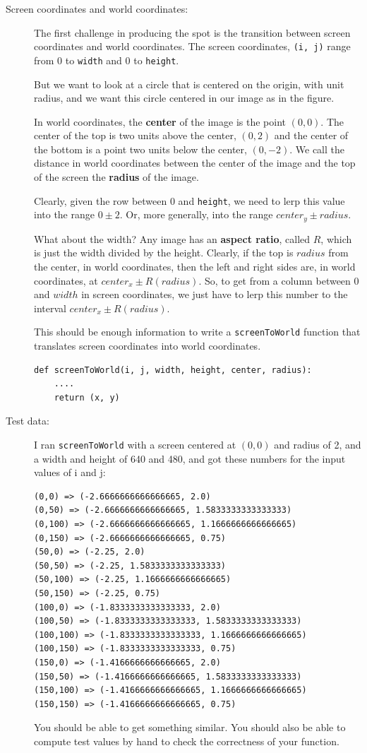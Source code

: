 \documentclass[12pt]{article}
\begin{document}
\begin{description}
\item[Screen coordinates and world coordinates:]
The first challenge in producing the spot
is the transition between screen coordinates
and world coordinates.  The screen coordinates,
\lstinline{(i, j)} range from 0 to \lstinline{width}
and 0 to \lstinline{height}.

But we want to look at a circle that is centered
on the origin, with unit radius, and we want this
circle centered in our image as in the figure.

In world coordinates, the {\bf center} of the image
is the point $(0,0)$.  The center of the top
is two units above the center, $(0,2)$
and the center of the bottom is a point
two units below the center, $(0,-2)$.  We call the
distance in world coordinates between the center
of the image and the top of the screen the {\bf radius}
of the image.

Clearly, given the row between 0 and \lstinline{height},
we need to lerp this value into the range $0 \pm 2$.
Or, more generally, into the range $center_y \pm radius$.

What about the width?  Any image has an {\bf aspect ratio},
called $R$, which is just the width divided by the height.
Clearly, if the top is $radius$ from the center, in world coordinates, then
the left and right sides are, in world coordinates,
at $center_x \pm R (radius)$.  So, to get from a column
between 0 and $width$ in screen coordinates, we just
have to lerp this number to the interval  $center_x \pm R (radius)$.

This should be enough information to
write a \lstinline{screenToWorld} function
that translates screen coordinates into world coordinates.
\begin{lstlisting}
def screenToWorld(i, j, width, height, center, radius):
    ....
    return (x, y)
\end{lstlisting}


\item[Test data:]  I ran \lstinline{screenToWorld}
with a screen centered at $(0,0)$ and radius of 2, and a width and height
of 640 and 480, and got these numbers for the input 
values of i and j:
\begin{lstlisting}
(0,0) => (-2.6666666666666665, 2.0)
(0,50) => (-2.6666666666666665, 1.5833333333333333)
(0,100) => (-2.6666666666666665, 1.1666666666666665)
(0,150) => (-2.6666666666666665, 0.75)
(50,0) => (-2.25, 2.0)
(50,50) => (-2.25, 1.5833333333333333)
(50,100) => (-2.25, 1.1666666666666665)
(50,150) => (-2.25, 0.75)
(100,0) => (-1.8333333333333333, 2.0)
(100,50) => (-1.8333333333333333, 1.5833333333333333)
(100,100) => (-1.8333333333333333, 1.1666666666666665)
(100,150) => (-1.8333333333333333, 0.75)
(150,0) => (-1.4166666666666665, 2.0)
(150,50) => (-1.4166666666666665, 1.5833333333333333)
(150,100) => (-1.4166666666666665, 1.1666666666666665)
(150,150) => (-1.4166666666666665, 0.75)
\end{lstlisting}
You should be able to get something similar.
You should also be able to compute test values by hand
to check the correctness of your function.


\end{description}
\end{document}
